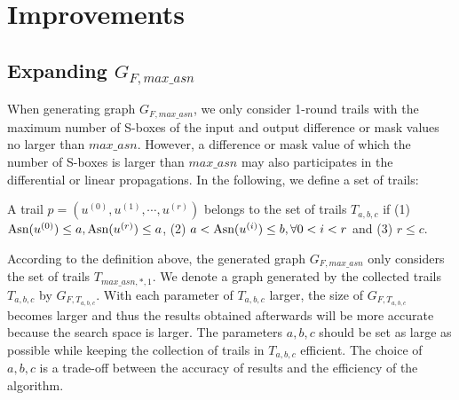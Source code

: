 



\section{Improvements}\label{sec:improvements}

\subsection{Expanding $G_{F,max\_asn}$}\label{sec:expansion}

When generating graph $G_{F,max\_asn}$, we only consider 1-round trails with the maximum number of S-boxes of the input and output difference or mask values no larger than $max\_asn$. However, a difference or mask value of which the number of S-boxes is larger than $max\_asn$ may also participates in the differential or linear propagations. In the following, we define a set of trails:

\begin{definition}
	A trail $p=(u^{(0)},u^{(1)},\cdots,u^{(r)})$ belongs to the set of trails $T_{a,b,c}$ if (1) $\text{Asn}(u^{(0)})\leq a,\text{Asn}(u^{(r)})\leq a$, (2) $a< \text{Asn}(u^{(i)})\leq b,\forall 0<i<r$ and (3) $r\leq c$.
\end{definition}

According to the definition above, the generated graph $G_{F,max\_asn}$ only considers the set of trails $T_{max\_asn,*,1}$. We denote a graph generated by the collected trails $T_{a,b,c}$ by $G_{F,T_{a,b,c}}$. With each parameter of $T_{a,b,c}$ larger, the size of $G_{F,T_{a,b,c}}$ becomes larger and thus the results obtained afterwards will be more accurate because the search space is larger. The parameters $a,b,c$ should be set as large as possible while keeping the collection of trails in $T_{a,b,c}$ efficient. The choice of $a,b,c$ is a trade-off between the accuracy of results and the efficiency of the algorithm.

